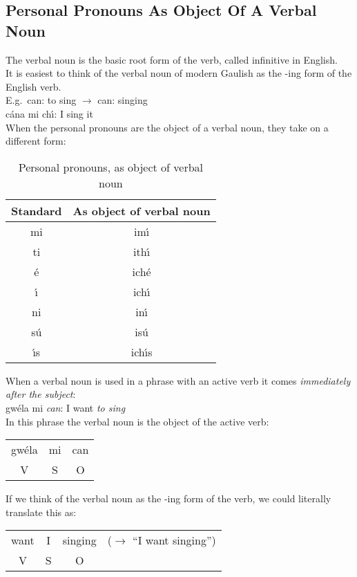 \subsection{Personal Pronouns As Object Of A Verbal Noun}

The verbal noun is the basic root form of the verb, called infinitive in English.\\

It is easiest to think of the verbal noun of modern Gaulish as the -ing form of the English verb.\\

E.g.\ can: to sing $\rightarrow$ can: singing\\
c\'{a}na mi ch\'{\i}: I sing it\\

When the personal pronouns are the object of a verbal noun, they take on a different form:
\begin{table}[H]
\centering
\begin{tabu}{c|c}
  \textbf{Standard} & \textbf{As object of verbal noun}\\
  \toprule
  mi & im\'{\i}\\
  ti & ith\'{\i}\\
  \'{e} & ich\'{e}\\
  \'{\i} & ich\'{\i}\\
  ni & in\'{\i}\\
  s\'{u} & is\'{u}\\
  \'{\i}s & ich\'{\i}s
\end{tabu}
\caption{Personal pronouns, as object of verbal noun}
\label{personal_pronouns_as_object_of_verbal_noun}
\end{table}

When a verbal noun is used in a phrase with an active verb it comes \textit{immediately after the subject}:\\

gw\'{e}la mi \textit{can}: I want \textit{to sing}\\

In this phrase the verbal noun is the object of the active verb:
\begin{table}[H]
\begin{tabu}{ccc}
  gw\'{e}la & mi & can\\
  V & S & O
\end{tabu}
\label{verbal_noun_object_of_active_verb}
\end{table}

If we think of the verbal noun as the -ing form of the verb, we could literally translate this as:
\begin{table}[H]
\begin{tabu}{cccc}
  want & I & singing & ($\rightarrow$ ``I want singing'')\\
  V & S & O &
\end{tabu}
\label{verbal_noun_ing_form}
\end{table}

